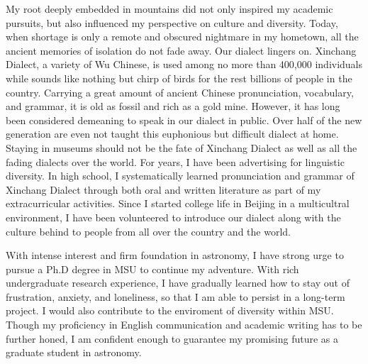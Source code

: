 \documentclass[11pt, a4paper]{awesome-cv} %
\begin{document}
\begin{cvletter}
My root deeply embedded in mountains did not only inspired my academic pursuits, but also influenced my perspective on culture and diversity. Today, when shortage is only a remote and obscured nightmare in my hometown, all the ancient memories of isolation do not fade away. Our dialect lingers on. Xinchang Dialect, a variety of Wu Chinese, is used among no more than 400,000 individuals while sounds like nothing but chirp of birds for the rest billions of people in the country. Carrying a great amount of ancient Chinese pronunciation, vocabulary, and grammar, it is old as fossil and rich as a gold mine. However, it has long been considered demeaning to speak in our dialect in public. Over half of the new generation are even not taught this euphonious but difficult dialect at home. Staying in museums should not be the fate of Xinchang Dialect as well as all the fading dialects over the world. For years, I have been advertising for linguistic diversity. In high school, I systematically learned pronunciation and grammar of Xinchang Dialect through both oral and written literature as part of my extracurricular activities. Since I started college life in Beijing in a multicultral environment, I have been volunteered to introduce our dialect along with the culture behind to people from all over the country and the world. 

With intense interest and firm foundation in astronomy, I have strong urge to pursue a Ph.D degree in MSU to continue my adventure. With rich undergraduate research experience, I have gradually learned how to stay out of frustration, anxiety, and loneliness, so that I am able to persist in a long-term project. I would also contribute to the enviroment of diversity within MSU. Though my proficiency in English communication and academic writing has to be further honed, I am confident enough to guarantee my promising future as a graduate student in astronomy.

\end{cvletter}


\end{document}
